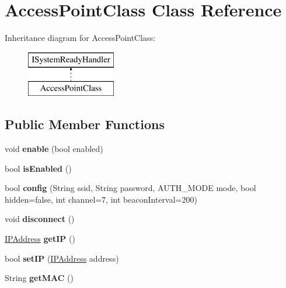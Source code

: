 \hypertarget{class_access_point_class}{}\section{Access\+Point\+Class Class Reference}
\label{class_access_point_class}
Inheritance diagram for Access\+Point\+Class\+:\begin{figure}[H]
\begin{center}
\leavevmode
\includegraphics[height=2.000000cm]{class_access_point_class}
\end{center}
\end{figure}
\subsection*{Public Member Functions}
\begin{DoxyCompactItemize}
\item 
\hypertarget{class_access_point_class_ae60f0c85e16ed930ed367b17dc5e573d}{}void {\bfseries enable} (bool enabled)\label{class_access_point_class_ae60f0c85e16ed930ed367b17dc5e573d}

\item 
\hypertarget{class_access_point_class_a305464a28372cfd2bfea6993b19ceb7f}{}bool {\bfseries is\+Enabled} ()\label{class_access_point_class_a305464a28372cfd2bfea6993b19ceb7f}

\item 
\hypertarget{class_access_point_class_a68aaa05943f9895d3cd5d4074e6354d4}{}bool {\bfseries config} (String ssid, String password, A\+U\+T\+H\+\_\+\+M\+O\+D\+E mode, bool hidden=false, int channel=7, int beacon\+Interval=200)\label{class_access_point_class_a68aaa05943f9895d3cd5d4074e6354d4}

\item 
\hypertarget{class_access_point_class_a2160f04e7d844b04a3eec1ed64d47f06}{}void {\bfseries disconnect} ()\label{class_access_point_class_a2160f04e7d844b04a3eec1ed64d47f06}

\item 
\hypertarget{class_access_point_class_a86061e944d41587d5b5355c45cc3b95f}{}\hyperlink{class_i_p_address}{I\+P\+Address} {\bfseries get\+I\+P} ()\label{class_access_point_class_a86061e944d41587d5b5355c45cc3b95f}

\item 
\hypertarget{class_access_point_class_a5fcd3f84c68fcaada0a548055c45b3cb}{}bool {\bfseries set\+I\+P} (\hyperlink{class_i_p_address}{I\+P\+Address} address)\label{class_access_point_class_a5fcd3f84c68fcaada0a548055c45b3cb}

\item 
\hypertarget{class_access_point_class_a9a6e9d50aa7c0b2349acf7bf986d237e}{}String {\bfseries get\+M\+A\+C} ()\label{class_access_point_class_a9a6e9d50aa7c0b2349acf7bf986d237e}

\end{DoxyCompactItemize}
